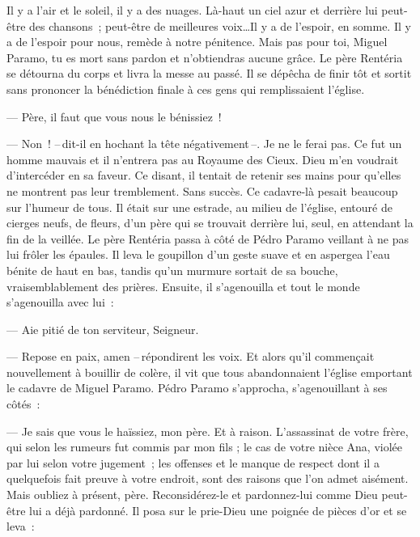  \og{}Il y a l'air et le soleil, il y a des nuages. Là-haut un ciel azur et derrière lui peut-être des chansons ; peut-être de meilleures voix\ldots Il y a de l'espoir, en somme. Il y a de l'espoir pour nous, remède à notre pénitence.
\pend
%
\pstart
  \guillemotright Mais pas pour toi, Miguel Paramo, tu es mort sans pardon et n'obtiendras aucune grâce.\fg{}
\pend
%
\pstart
  Le père Rentéria se détourna du corps et livra la messe au passé. Il se dépêcha de finir tôt et sortit sans prononcer la bénédiction finale à ces gens qui remplissaient l'église.

  --- Père, il faut que vous nous le bénissiez !

  --- Non ! --\,dit-il en hochant la tête négativement\,--. Je ne le ferai pas. Ce fut un homme mauvais et il n'entrera pas au Royaume des Cieux. Dieu m'en voudrait d'intercéder en sa faveur.
\pend
%
\pstart
  Ce disant, il tentait de retenir ses mains pour qu'elles ne montrent pas leur tremblement. Sans succès.
\pend
%
\pstart
  Ce cadavre-là pesait beaucoup sur l'humeur de tous. Il était sur une estrade, au milieu de l'église, entouré de cierges neufs, de fleurs, d'un père qui se trouvait derrière lui, seul, en attendant la fin de la veillée.
\pend
%
\pstart
  Le père Rentéria passa à côté de Pédro Paramo veillant à ne pas lui frôler les épaules. Il leva le goupillon d'un geste suave et en aspergea l'eau bénite de haut en bas, tandis qu'un murmure sortait de sa bouche, vraisemblablement des prières. Ensuite, il s'agenouilla et tout le monde s'agenouilla avec lui :

  --- Aie pitié de ton serviteur, Seigneur.

  --- Repose en paix, amen --\,répondirent les voix.
\pend
%
\pstart
  Et alors qu'il commençait nouvellement à bouillir de colère, il vit que tous abandonnaient l'église emportant le cadavre de Miguel Paramo.
\pend
%
\pstart
  Pédro Paramo s'approcha, s'agenouillant à ses côtés :

  --- Je sais que vous le haïssiez, mon père. Et à raison. L'assassinat de votre frère, qui selon les rumeurs fut commis par mon fils ; le cas de votre nièce Ana, violée par lui selon votre jugement ; les offenses et le manque de respect dont il a quelquefois fait preuve à votre endroit, sont des raisons que l'on admet aisément. Mais oubliez à présent, père. Reconsidérez-le et pardonnez-lui comme Dieu peut-être lui a déjà pardonné.
\pend
%
\pstart
  Il posa sur le prie-Dieu une poignée de pièces d'or et se leva :

